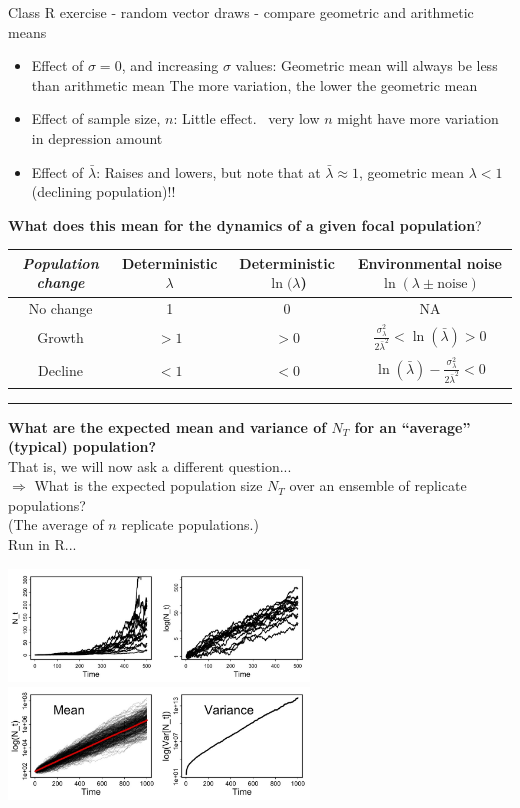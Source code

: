 \documentclass{article}
\newcommand{\note}[1]{\colorbox{gray!20}{#1}}
\newcommand{\ind}{\-\hspace{1cm}}
\begin{document}
\pagebreak

\note{Class R exercise} - random vector draws - compare geometric and arithmetic means 
\begin{itemize}
	\item Effect of $\sigma = 0$, and increasing $\sigma$ values:
		\subitem	Geometric mean will always be less than arithmetic mean 
		\subitem	The more variation, the lower the geometric mean 
	\item	Effect of sample size, $n$:
		 \subitem	Little effect.  very low $n$ might have more variation in depression amount 
	\item	Effect of $\bar{\lambda}$:
		\subitem Raises and lowers, but note that at $\bar{\lambda}\approx 1$, geometric mean $\lambda < 1$  (declining population)!!
\end{itemize}

\textbf{What does this mean for the dynamics of a given focal population}?
\begin{center}
\begin{tabular}{|c|c|c|c|}
\hline \rule[-2ex]{0pt}{5.5ex} \emph{Population change} &  Deterministic $\lambda$ & Deterministic $\ln(\lambda$) &  Environmental noise $\ln(\lambda \pm \text{noise})$\\ 
\hline \rule[-2ex]{0pt}{5.5ex} No change & 1 & 0 & NA \\
\hline \rule[-2ex]{0pt}{5.5ex} Growth  & $>1$ & $>0$  & $\frac{\sigma_\lambda^2}{2\bar{\lambda}^2} <  \ln(\bar{\lambda})>0$  \\ 
\hline \rule[-2ex]{0pt}{5.5ex} Decline & $<1$ & $<0$  & $\ln(\bar{\lambda})-\frac{\sigma_\lambda^2}{2\bar{\lambda}^2}<0$  \\ 
\hline 
\end{tabular}
\end{center} 

\rule[0.5ex]{\linewidth}{1pt}

\textbf{What are the expected mean and variance of $N_T$ for an ``average'' (typical) population?}\\
That is, we will now ask a different question...\\
\ind $\Rightarrow$ What is the expected population size $N_T$ over an ensemble of replicate populations?\\
\ind (The average of $n$ replicate populations.)\\
\note{Run in R...}
\begin{center}
 \includegraphics[width=8cm]{figs/image1}\\
 \includegraphics[width=8cm]{figs/image2}
\end{center}
\end{document}
